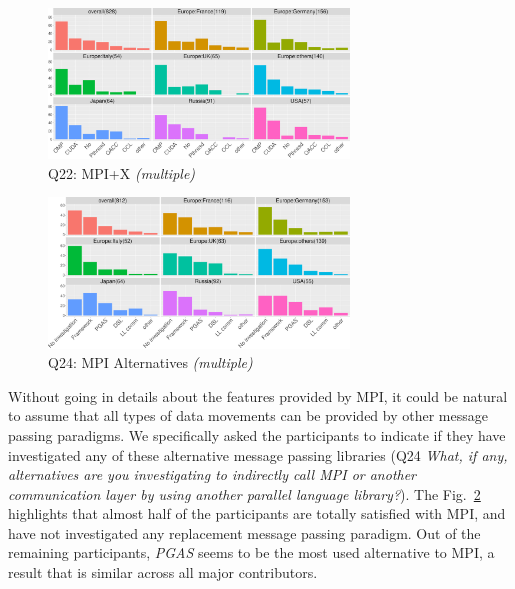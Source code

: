 \documentclass[preprint,5p,times]{elsarticle}
\def\myquote#1{{\it #1}}
\def\mcountries{major contributors\xspace{}}%
\begin{document}
\begin{figure}[tb]
\begin{center}
\includegraphics[width=8.0cm]{R-scripts/Q22.pdf}
\vspace{-2mm}
\caption{Q22: MPI+X {\it(multiple)}}
\label{fig:mpi-x}
\end{center}
\end{figure}

\begin{figure}[tb]
\begin{center}
\includegraphics[width=8.0cm]{R-scripts/Q24.pdf}
\vspace{-2mm}
\caption{Q24: MPI Alternatives {\it(multiple)}}
\label{fig:mpi-alternatives}
\end{center}
\end{figure}

Without going in details about the features provided by MPI, it could be natural
to assume that all types of data movements can be provided by other message
passing paradigms. We specifically asked the participants to indicate if they
have investigated any of these alternative message passing libraries (Q24
\myquote{What, if any, alternatives are you investigating to indirectly call MPI
or another communication layer by using another parallel language library?}).
The Fig.~\ref{fig:mpi-alternatives} highlights that almost half of the
participants are totally satisfied with MPI, and have not investigated any
replacement message passing paradigm. Out of the remaining participants,
\myquote{PGAS} seems to be the most used alternative to MPI, a result that is
similar across all \mcountries.

\end{document}
